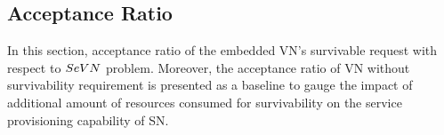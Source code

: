 




\subsection{Acceptance Ratio}
In this section, acceptance ratio of the embedded VN's survivable request with respect to $SeVN$ problem. Moreover, the acceptance ratio of VN without survivability requirement is presented as a baseline to gauge the impact of additional amount of resources consumed for survivability on the service provisioning capability of SN.

